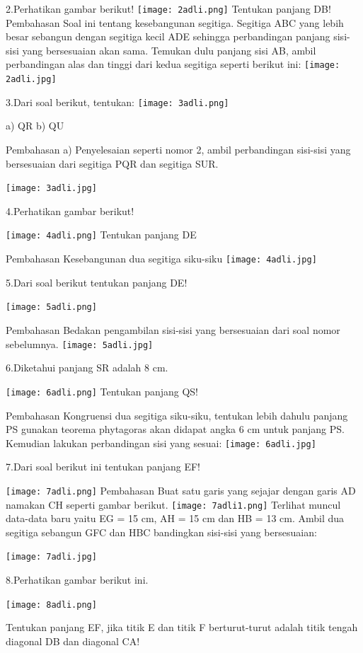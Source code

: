 \documentclass[11pt,fleqn]{book} %
\begin{document}
2.Perhatikan gambar berikut! 
 \texttt{[image: 2adli.png]}
Tentukan panjang DB!
Pembahasan
Soal ini tentang kesebangunan segitiga. Segitiga ABC yang lebih besar sebangun dengan segitiga kecil ADE sehingga perbandingan panjang sisi-sisi yang bersesuaian akan sama. Temukan dulu panjang sisi AB, ambil perbandingan alas dan tinggi dari kedua segitiga seperti berikut ini:
\texttt{[image: 2adli.jpg]}

3.Dari soal berikut, tentukan:
 \texttt{[image: 3adli.png]}
 
a) QR
b) QU

Pembahasan
a) Penyelesaian seperti nomor 2, ambil perbandingan sisi-sisi yang bersesuaian dari segitiga PQR dan segitiga SUR. 

\texttt{[image: 3adli.jpg]}

4.Perhatikan gambar berikut! 
 
\texttt{[image: 4adli.png]}
Tentukan panjang DE

Pembahasan
Kesebangunan dua segitiga siku-siku 
\texttt{[image: 4adli.jpg]}

5.Dari soal berikut tentukan panjang DE! 
 
\texttt{[image: 5adli.png]}

Pembahasan
Bedakan pengambilan sisi-sisi yang bersesuaian dari soal nomor sebelumnya. 
\texttt{[image: 5adli.jpg]}

6.Diketahui panjang SR adalah 8 cm. 

\texttt{[image: 6adli.png]}
Tentukan panjang QS!

Pembahasan
Kongruensi dua segitiga siku-siku, tentukan lebih dahulu panjang PS gunakan teorema phytagoras akan didapat angka 6 cm untuk panjang PS. Kemudian lakukan perbandingan sisi yang sesuai: 
\texttt{[image: 6adli.jpg]}

7.Dari soal berikut ini tentukan panjang EF! 
 
\texttt{[image: 7adli.png]}
Pembahasan
Buat satu garis yang sejajar dengan garis AD namakan CH seperti gambar berikut. 
\texttt{[image: 7adli1.png]}
Terlihat muncul  data-data baru yaitu EG = 15 cm, AH = 15 cm dan HB = 13 cm. Ambil dua segitiga sebangun GFC dan HBC bandingkan sisi-sisi yang bersesuaian:

\texttt{[image: 7adli.jpg]}

8.Perhatikan gambar berikut ini. 

\texttt{[image: 8adli.png]}

Tentukan panjang EF, jika titik E dan titik F berturut-turut adalah titik tengah diagonal DB dan diagonal CA!
\end{document}
